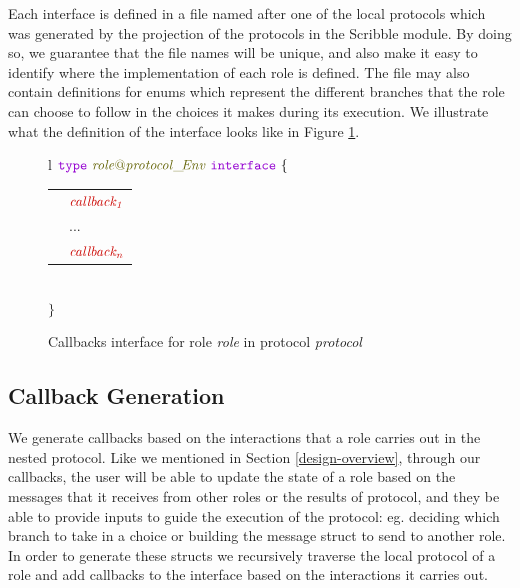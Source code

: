 \documentclass[12pt,twoside]{report}
\begin{document}
Each interface is defined in a file named after one of the local protocols which was generated by the projection of the protocols in the Scribble module. By doing so, we guarantee that the file names will be unique, and also make it easy to identify where the implementation of each role is defined. The file may also contain definitions for enums which represent the different branches that the role can choose to follow in the choices it makes during its execution. We illustrate what the definition of the interface looks like in Figure \ref{callbacks-interface-gen}.\\

\begin{figure}[!h]
    \begin{center}
        \begin{tabular}{l}
            $\gotype\ \interfacename{\localprotocol{role}{protocol}\_\!Env}\ \gointerface\ \{$ \\[3pt]
            \begin{tabular}{ll}
                \indent & $\functionname{callback_1}$\\[3.5pt]
                \indent & ...\\[3.5pt]
                \indent & $\functionname{callback_n}$\\[3.5pt]
            \end{tabular}\\[3pt]
            $\}$
        \end{tabular}

    \end{center}
    \caption{Callbacks interface for role \textit{role} in protocol \textit{protocol}}
    \label{callbacks-interface-gen}
\end{figure}

\subsection{Callback Generation}

We generate callbacks based on the interactions that a role carries out in the nested protocol. Like we mentioned in Section \ref{design-overview}, through our callbacks, the user will be able to update the state of a role based on the messages that it receives from other roles or the results of protocol, and they be able to provide inputs to guide the execution of the protocol: eg. deciding which branch to take in a choice or building the message struct to send to another role. In order to generate these structs we recursively traverse the local protocol of a role and add callbacks to the interface based on the interactions it carries out.\\
\end{document}

